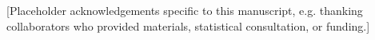 [Placeholder acknowledgements specific to this manuscript, e.g. thanking
collaborators who provided materials, statistical consultation, or funding.]
